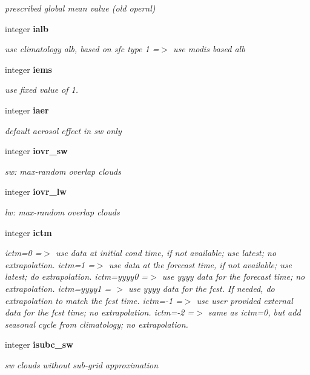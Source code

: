 \begin{DoxyCompactItemize}
\begin{DoxyCompactList}\small\item\em prescribed global mean value (old opernl) \end{DoxyCompactList}\item 
integer \textbf{ ialb}
\begin{DoxyCompactList}\small\item\em use climatology alb, based on sfc type 1 =$>$ use modis based alb \end{DoxyCompactList}\item 
integer \textbf{ iems}
\begin{DoxyCompactList}\small\item\em use fixed value of 1. \end{DoxyCompactList}\item 
integer \textbf{ iaer}
\begin{DoxyCompactList}\small\item\em default aerosol effect in sw only \end{DoxyCompactList}\item 
integer \textbf{ iovr\+\_\+sw}
\begin{DoxyCompactList}\small\item\em sw\+: max-\/random overlap clouds \end{DoxyCompactList}\item 
integer \textbf{ iovr\+\_\+lw}
\begin{DoxyCompactList}\small\item\em lw\+: max-\/random overlap clouds \end{DoxyCompactList}\item 
integer \textbf{ ictm}
\begin{DoxyCompactList}\small\item\em ictm=0 =$>$ use data at initial cond time, if not available; use latest; no extrapolation. ictm=1 =$>$ use data at the forecast time, if not available; use latest; do extrapolation. ictm=yyyy0 =$>$ use yyyy data for the forecast time; no extrapolation. ictm=yyyy1 = $>$ use yyyy data for the fcst. If needed, do extrapolation to match the fcst time. ictm=-\/1 =$>$ use user provided external data for the fcst time; no extrapolation. ictm=-\/2 =$>$ same as ictm=0, but add seasonal cycle from climatology; no extrapolation. \end{DoxyCompactList}\item 
integer \textbf{ isubc\+\_\+sw}
\begin{DoxyCompactList}\small\item\em sw clouds without sub-\/grid approximation \end{DoxyCompactList}\item 

\end{DoxyCompactItemize}
